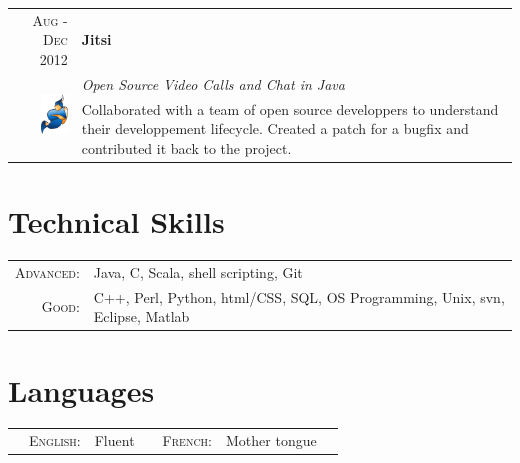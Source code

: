 \documentclass[a4paper,11pt]{article} %
\begin{document}
\begin{tabularx}{\textwidth}{r|X}

\textsc{Aug - Dec 2012} & \textbf{Jitsi}\\
\multirow{3}{*}{ \includegraphics[height=30pt]{img/jitsi.eps}}
& \emph{Open Source Video Calls and Chat in Java}\\ 
& \footnotesize{Collaborated with a team of open source developpers to
understand their developpement lifecycle. Created a patch for a
bugfix and contributed it back to the project.}
\end{tabularx}


\section{Technical Skills}
\begin{center}
\begin{tabular}{rl}
\textsc{\large{Advanced}}: & Java, C, Scala, shell scripting, Git\\
\textsc{\large{Good}}: & C++, Perl, Python, html/CSS, SQL, OS Programming, Unix, svn, Eclipse, Matlab\\
\end{tabular}
\end{center}


\section{Languages}

\begin{center}
\begin{tabularx}{\textwidth}{XrlXrlX}
&\textsc{\large{English:}} & Fluent & &
\textsc{\large{French:}} & Mother tongue & 
\end{tabularx}
\end{center}

\end{document}

